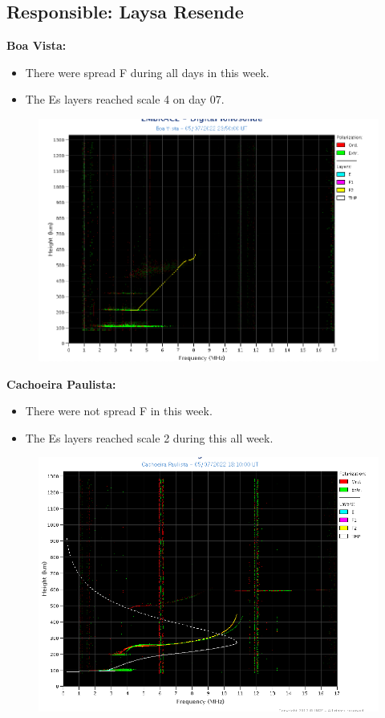 \documentclass[11pt, oneside]{article}
\begin{document}
 \subsection{Responsible: Laysa Resende} 
 
\textbf{Boa Vista: }

 \begin{itemize}
\item There were spread F during all days in this week.
\item The Es layers reached scale 4 on day 07. 
\end{itemize}
\begin{figure}[H]
    \centering
    \includegraphics[width=14cm]{./figures//BoaVista.png}
\end{figure}

\textbf{Cachoeira Paulista:}

 \begin{itemize}
\item There were not spread F in this week.
\item The Es layers reached scale 2 during this all week. 
\end{itemize}
\begin{figure}[H]
    \centering
    \includegraphics[width=14cm]{./figures//CachoeiraPaulista.png}
\end{figure}
\end{document}
